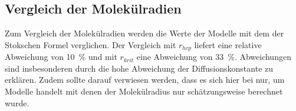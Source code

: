 \subsection{Vergleich der Molekülradien}
Zum Vergleich der Molekülradien werden die Werte der Modelle mit dem der Stokschen Formel verglichen. 
Der Vergleich mit $r_{hcp}$ liefert eine relative Abweichung von \SI{10}{\percent} und 
mit $r_{krit}$ eine Abweichung von 
\SI{33}{\percent}. Abweichungen sind insbesonderen durch die hohe Abweichung der Diffusionskonstante 
zu erklären. Zudem sollte darauf verwiesen werden, dass es sich hier bei nur, um Modelle handelt mit denen 
der Molekülradius nur schätzungsweise berechnet wurde. 
